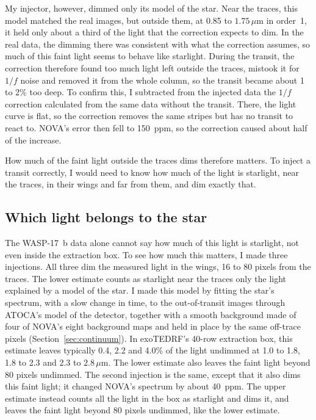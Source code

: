 My injector, however, dimmed only its model of the star. Near the traces, this model matched the real images, but outside them, at 0.85 to $1.75\,\mu\mathrm{m}$ in order~1, it held only about a third of the light that the correction expects to dim. In the real data, the dimming there was consistent with what the correction assumes, so much of this faint light seems to behave like starlight. During the transit, the correction therefore found too
much light left outside the traces, mistook it for $1/f$ noise and removed it
from the whole column, so the transit became about 1 to 2\% too deep. To
confirm this, I subtracted from the injected data the $1/f$ correction
calculated from the same data without the transit. There, the light curve is
flat, so the correction removes the same stripes but has no transit to react
to. NOVA's error then fell to 150~ppm, so the correction caused about half of
the increase.

How much of the faint light outside the traces dims therefore matters.
To inject a transit correctly, I would need to know how much of the light is
starlight, near the traces, in their wings and far from them, and dim exactly
that.

\subsection{Which light belongs to the star}
\label{sec:which-light}

The WASP-17~b data alone cannot say how much of this light is starlight, not
even inside the extraction box. To see how much this matters, I made three
injections. All three dim the measured light in the wings, 16 to 80 pixels
from the traces. The lower estimate counts as starlight near the traces only
the light explained by a model of the star. I made this model by fitting the
star's spectrum, with a slow change in time, to the out-of-transit images
through ATOCA's model of the detector, together with a smooth background made
of four of NOVA's eight background maps and held in place by the same
off-trace pixels (Section~\ref{sec:continuum}). In exoTEDRF's 40-row extraction box, this estimate leaves typically 0.4, 2.2 and 4.0\% of the light undimmed at 1.0 to 1.8, 1.8 to 2.3 and 2.3 to $2.8\,\mu\mathrm{m}$. The lower estimate also leaves the faint light beyond 80
pixels undimmed. The second injection is the same, except that it also dims
this faint light; it changed NOVA's spectrum by about 40~ppm. The upper
estimate instead counts all the light in the box as starlight and dims it,
and leaves the faint light beyond 80 pixels undimmed, like the lower estimate.

